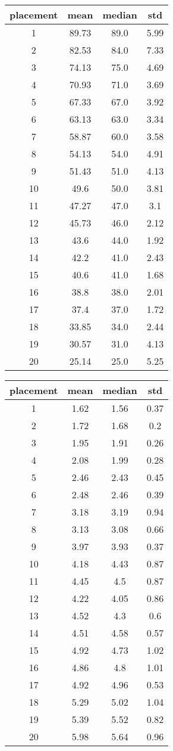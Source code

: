 \begin{table}
\centering
\begin{tabular}{cccc}
placement & mean & median & std \\
\hline
1 & 89.73 & 89.0 & 5.99 \\
2 & 82.53 & 84.0 & 7.33 \\
3 & 74.13 & 75.0 & 4.69 \\
4 & 70.93 & 71.0 & 3.69 \\
5 & 67.33 & 67.0 & 3.92 \\
6 & 63.13 & 63.0 & 3.34 \\
7 & 58.87 & 60.0 & 3.58 \\
8 & 54.13 & 54.0 & 4.91 \\
9 & 51.43 & 51.0 & 4.13 \\
10 & 49.6 & 50.0 & 3.81 \\
11 & 47.27 & 47.0 & 3.1 \\
12 & 45.73 & 46.0 & 2.12 \\
13 & 43.6 & 44.0 & 1.92 \\
14 & 42.2 & 41.0 & 2.43 \\
15 & 40.6 & 41.0 & 1.68 \\
16 & 38.8 & 38.0 & 2.01 \\
17 & 37.4 & 37.0 & 1.72 \\
18 & 33.85 & 34.0 & 2.44 \\
19 & 30.57 & 31.0 & 4.13 \\
20 & 25.14 & 25.0 & 5.25 \\
\end{tabular}
\end{table}


\begin{table}
\centering
\begin{tabular}{cccc}
placement & mean & median & std \\
\hline
1 & 1.62 & 1.56 & 0.37 \\
2 & 1.72 & 1.68 & 0.2 \\
3 & 1.95 & 1.91 & 0.26 \\
4 & 2.08 & 1.99 & 0.28 \\
5 & 2.46 & 2.43 & 0.45 \\
6 & 2.48 & 2.46 & 0.39 \\
7 & 3.18 & 3.19 & 0.94 \\
8 & 3.13 & 3.08 & 0.66 \\
9 & 3.97 & 3.93 & 0.37 \\
10 & 4.18 & 4.43 & 0.87 \\
11 & 4.45 & 4.5 & 0.87 \\
12 & 4.22 & 4.05 & 0.86 \\
13 & 4.52 & 4.3 & 0.6 \\
14 & 4.51 & 4.58 & 0.57 \\
15 & 4.92 & 4.73 & 1.02 \\
16 & 4.86 & 4.8 & 1.01 \\
17 & 4.92 & 4.96 & 0.53 \\
18 & 5.29 & 5.02 & 1.04 \\
19 & 5.39 & 5.52 & 0.82 \\
20 & 5.98 & 5.64 & 0.96 \\
\end{tabular}
\end{table}

